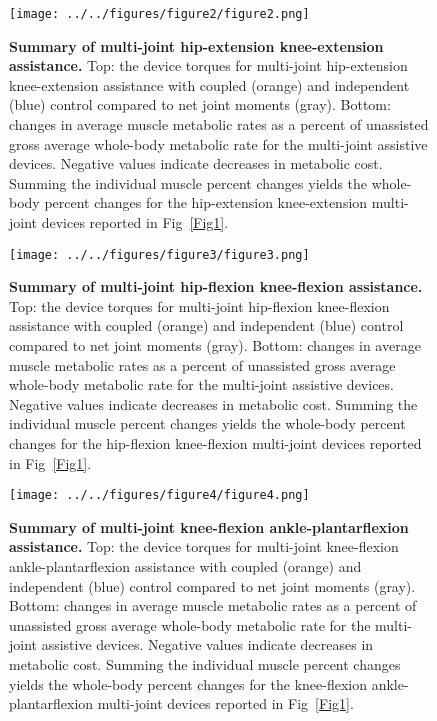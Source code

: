 \documentclass[10pt,letterpaper]{article}
\begin{document}
\begin{figure}[!h]
\begin{adjustwidth}{-1in}{0in} %
    \centering
    \texttt{[image: ../../figures/figure2/figure2.png]}
    \caption{{\bf Summary of multi-joint hip-extension knee-extension assistance.}
        Top: the device torques for multi-joint hip-extension knee-extension assistance with coupled (orange) and independent (blue) control compared to net joint moments (gray). Bottom: changes in average muscle metabolic rates as a percent of unassisted gross average whole-body metabolic rate for the multi-joint assistive devices. Negative values indicate decreases in metabolic cost. Summing the individual muscle percent changes yields the whole-body percent changes for the hip-extension knee-extension multi-joint devices reported in Fig~\ref{Fig1}.}
\label{Fig2}
\end{adjustwidth}
\end{figure} 

\begin{figure}[!h]
\begin{adjustwidth}{-1in}{0in} %
    \centering
    \texttt{[image: ../../figures/figure3/figure3.png]}
    \caption{{\bf Summary of multi-joint hip-flexion knee-flexion assistance.}
        Top: the device torques for multi-joint hip-flexion knee-flexion assistance with coupled (orange) and independent (blue) control compared to net joint moments (gray). Bottom: changes in average muscle metabolic rates as a percent of unassisted gross average whole-body metabolic rate for the multi-joint assistive devices. Negative values indicate decreases in metabolic cost. Summing the individual muscle percent changes yields the whole-body percent changes for the hip-flexion knee-flexion multi-joint devices reported in Fig~\ref{Fig1}.}
\label{Fig3}
\end{adjustwidth}
\end{figure}

\begin{figure}[!h]
\begin{adjustwidth}{-1in}{0in} %
    \centering
    \texttt{[image: ../../figures/figure4/figure4.png]}
    \caption{{\bf Summary of multi-joint knee-flexion ankle-plantarflexion assistance.}
        Top: the device torques for multi-joint knee-flexion ankle-plantarflexion assistance with coupled (orange) and independent (blue) control compared to net joint moments (gray). Bottom: changes in average muscle metabolic rates as a percent of unassisted gross average whole-body metabolic rate for the multi-joint assistive devices. Negative values indicate decreases in metabolic cost. Summing the individual muscle percent changes yields the whole-body percent changes for the knee-flexion ankle-plantarflexion multi-joint devices reported in Fig~\ref{Fig1}.}
\label{Fig4}
\end{adjustwidth}
\end{figure}
\end{document}
